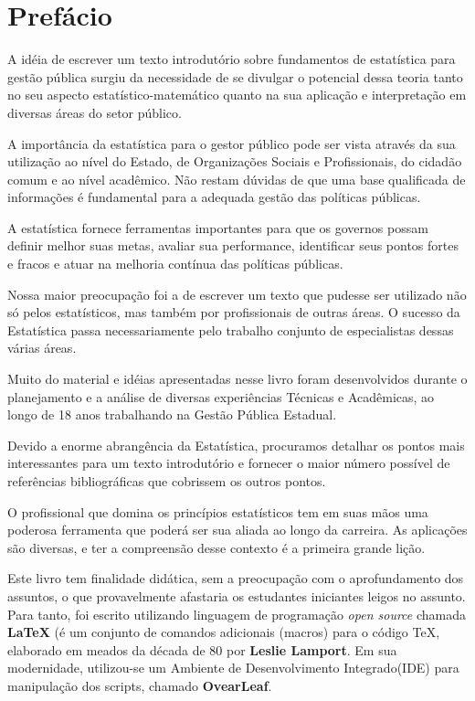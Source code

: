 \chapter*{Prefácio}

\inic A idéia de escrever um texto introdutório sobre fundamentos de estatística para gestão pública surgiu da necessidade de se divulgar o potencial dessa teoria tanto no
seu aspecto estatístico-matemático quanto na sua aplicação e
interpretação em diversas áreas do setor público.\vst

A importância da estatística para o gestor público pode ser vista através da sua utilização ao nível do Estado, de Organizações Sociais e Profissionais, do cidadão comum e ao nível acadêmico. Não restam dúvidas de que uma base qualificada de informações é fundamental para a adequada gestão das políticas públicas.\vst  

A estatística fornece ferramentas importantes para que os governos possam definir melhor suas metas, avaliar sua performance, identificar seus pontos fortes e fracos e atuar na melhoria contínua das políticas públicas.
\vst

Nossa maior preocupação foi a de escrever um texto que pudesse ser
utilizado não só pelos estatísticos, mas também por profissionais de outras áreas. O sucesso da Estatística passa necessariamente
pelo trabalho conjunto de especialistas dessas várias áreas. \vst

Muito do material e idéias apresentadas nesse livro foram
desenvolvidos durante o planejamento e a análise de diversas experiências Técnicas e Acadêmicas, ao longo de 18 anos trabalhando na Gestão Pública Estadual.
\vst 


Devido a enorme abrangência da Estatística, procuramos detalhar os pontos mais interessantes para um texto introdutório e fornecer o maior número possível de referências bibliográficas que cobrissem os outros pontos.\vst

O profissional que domina os princípios estatísticos tem em suas mãos uma poderosa ferramenta que poderá ser sua aliada ao longo da carreira. As aplicações são diversas, e ter a compreensão desse contexto é a primeira grande lição.
\vst

\newpage
Este livro tem finalidade didática, sem a preocupação com o aprofundamento dos assuntos, o que provavelmente afastaria os estudantes iniciantes leigos no assunto. Para tanto, foi escrito utilizando linguagem de programação \textit{open source} chamada \textbf{\LaTeX} (é um conjunto de comandos adicionais (macros) para o código \TeX, elaborado em meados da década de 80 por \textbf{Leslie Lamport}. Em sua modernidade, utilizou-se um Ambiente de Desenvolvimento Integrado(IDE) para manipulação dos scripts, chamado \textbf{OvearLeaf}. \vst


